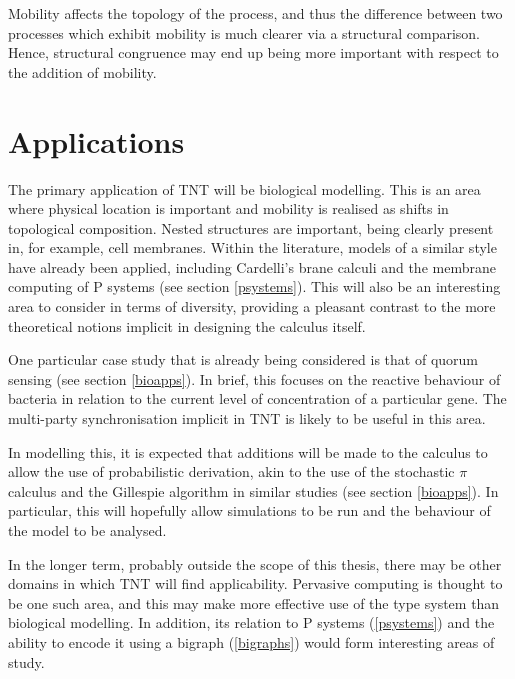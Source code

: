 Mobility affects the topology of the process, and thus the difference
between two processes which exhibit mobility is much clearer via a
structural comparison.  Hence, structural congruence may end up being
more important with respect to the addition of mobility.

\section{Applications}
\label{futureapp}

The primary application of TNT will be biological modelling.  This is an
area where physical location is important and mobility is realised as
shifts in topological composition.  Nested structures are important,
being clearly present in, for example, cell membranes.  Within the
literature, models of a similar style have already been applied,
including Cardelli's brane calculi \cite{brane04} and the membrane
computing of P systems (see section \ref{psystems}).  This will also be
an interesting area to consider in terms of diversity, providing a
pleasant contrast to the more theoretical notions implicit in
designing the calculus itself.

One particular case study that is already being considered is that of
quorum sensing (see section \ref{bioapps}).  In brief, this
focuses on the reactive behaviour of bacteria in relation to the current
level of concentration of a particular gene.  The multi-party
synchronisation implicit in TNT is likely to be useful in this area.

In modelling this, it is expected that additions will be made to the
calculus to allow the use of probabilistic derivation, akin to the use
of the stochastic $\pi$ calculus and the Gillespie algorithm in similar
studies (see section \ref{bioapps}).  In particular, this will hopefully
allow simulations to be run and the behaviour of the model to be
analysed.

In the longer term, probably outside the scope of this thesis, there may
be other domains in which TNT will find applicability.  Pervasive
computing is thought to be one such area, and this may make more
effective use of the type system than biological modelling.  In
addition, its relation to P systems (\ref{psystems}) and the ability to
encode it using a bigraph (\ref{bigraphs}) would form interesting areas
of study.